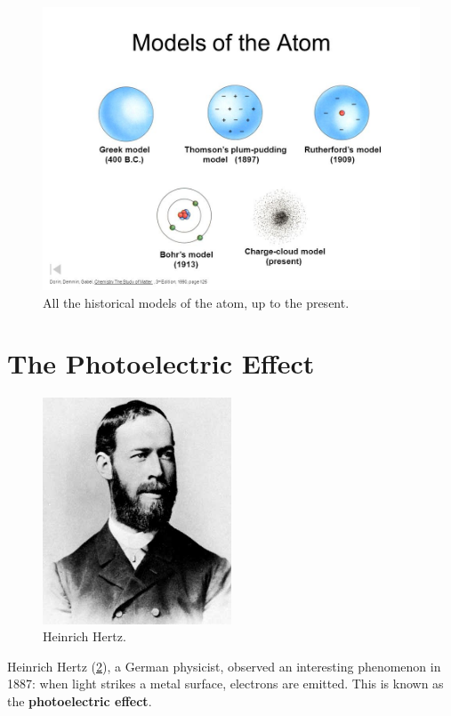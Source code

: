 \documentclass[a4paper]{amsbook}
\theoremstyle{definition}
\numberwithin{exercise}{chapter}
\numberwithin{exercise}{chapter}
\begin{document}
\begin{figure}
  \centering
  \includegraphics[width=\textwidth]{allmodels}
  \caption{All the historical models of the atom, up to the present. \label{fig:allmodels}}
\end{figure}

\section{The Photoelectric Effect}
\begin{figure}
  \centering
  \includegraphics[width=0.5\textwidth]{hertz}
  \caption{Heinrich Hertz. \label{fig:hertz}}
\end{figure}
Heinrich Hertz (\cref{fig:hertz}), a German physicist, observed an interesting phenomenon in 1887: when light strikes a metal surface, electrons
are emitted. This is known as the \textbf{photoelectric effect}.
\end{document}
